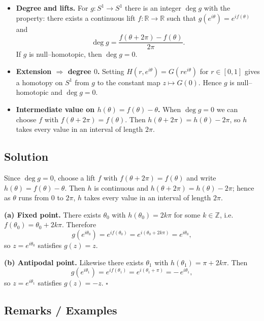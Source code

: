 \documentclass[12pt,a4paper]{article}
\newcommand{\qed}{\hfill$\square$}
\theoremstyle{plain}
\theoremstyle{definition}
\theoremstyle{remark}
\theoremstyle{remark}
\begin{document}
\begin{itemize}
	\item \textbf{Degree and lifts.} For $g:S^{1}\to S^{1}$ there is an integer $\deg g$ with the property:
	there exists a continuous lift $f:\mathbb R\to\mathbb R$ such that
	$g(e^{i\theta})=e^{if(\theta)}$ and
	\[
	\deg g=\frac{f(\theta+2\pi)-f(\theta)}{2\pi}.
	\]
	If $g$ is null–homotopic, then $\deg g=0$.
	
	\item \textbf{Extension $\Rightarrow$ degree $0$.}
	Setting $H(r,e^{i\theta})=G(re^{i\theta})$ for $r\in[0,1]$ gives a homotopy on $S^{1}$
	from $g$ to the constant map $z\mapsto G(0)$. Hence $g$ is null–homotopic and $\deg g=0$.
	
	\item \textbf{Intermediate value on $h(\theta)=f(\theta)-\theta$.}
	When $\deg g=0$ we can choose $f$ with $f(\theta+2\pi)=f(\theta)$.
	Then $h(\theta+2\pi)=h(\theta)-2\pi$, so $h$ takes every value in an interval of length $2\pi$.
\end{itemize}

\bigskip

\subsection*{Solution}

Since $\deg g=0$, choose a lift $f$ with $f(\theta+2\pi)=f(\theta)$ and write $h(\theta)=f(\theta)-\theta$.
Then $h$ is continuous and $h(\theta+2\pi)=h(\theta)-2\pi$; hence as $\theta$ runs from $0$ to $2\pi$,
$h$ takes every value in an interval of length $2\pi$.

\smallskip
\noindent\textbf{(a) Fixed point.}
There exists $\theta_0$ with $h(\theta_0)=2k\pi$ for some $k\in\mathbb Z$, i.e.
$f(\theta_0)=\theta_0+2k\pi$. Therefore
\[
g(e^{i\theta_0})=e^{if(\theta_0)}=e^{i(\theta_0+2k\pi)}=e^{i\theta_0},
\]
so $z=e^{i\theta_0}$ satisfies $g(z)=z$.

\smallskip
\noindent\textbf{(b) Antipodal point.}
Likewise there exists $\theta_1$ with $h(\theta_1)=\pi+2k\pi$.
Then
\[
g(e^{i\theta_1})=e^{if(\theta_1)}=e^{i(\theta_1+\pi)}=-\,e^{i\theta_1},
\]
so $z=e^{i\theta_1}$ satisfies $g(z)=-z$.
\qed

\bigskip

\subsection*{Remarks / Examples}
\end{document}
